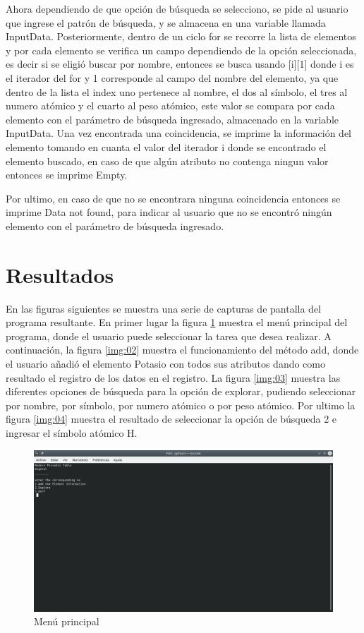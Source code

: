 \documentclass[conference]{IEEEtran}
\begin{document}
Ahora dependiendo de que opción de búsqueda se selecciono, se pide al usuario que ingrese el patrón de búsqueda, y se almacena en una variable llamada InputData. Posteriormente, dentro de un ciclo for se recorre la lista de elementos y por cada elemento se verifica un campo dependiendo de la opción seleccionada, es decir si se eligió buscar por nombre, entonces se busca usando [i][1] donde i es el iterador del for y 1 corresponde al campo del nombre del elemento, ya que dentro de la lista el index uno pertenece al nombre, el dos al símbolo, el tres al numero atómico y el cuarto al peso atómico, este valor se compara por cada elemento con el parámetro de búsqueda ingresado, almacenado en la variable InputData. Una vez encontrada una coincidencia, se imprime la información del elemento tomando en cuanta el valor del iterador i donde se encontrado el elemento buscado, en caso de que algún atributo no contenga ningun valor entonces se imprime Empty.

Por ultimo, en caso de que no se encontrara ninguna coincidencia entonces se imprime Data not found, para indicar al usuario que no se encontró ningún elemento con el parámetro de búsqueda ingresado.

\section{Resultados}
En las figuras siguientes se muestra una serie de capturas de pantalla del programa resultante. En primer lugar la figura \ref{img:01} muestra el menú principal del programa, donde el usuario puede seleccionar la tarea que desea realizar. A continuación, la figura \ref{img:02} muestra el funcionamiento del método add, donde el usuario añadió el elemento Potasio con todos sus atributos dando como resultado el registro de los datos en el registro. La figura \ref{img:03} muestra las diferentes opciones de búsqueda para la opción de explorar, pudiendo seleccionar por nombre, por símbolo, por numero atómico o por peso atómico. Por ultimo la figura \ref{img:04} muestra el resultado de seleccionar la opción de búsqueda 2 e ingresar el símbolo atómico H.\par




\begin{figure}[h!]
\includegraphics[width=1 \columnwidth]{cap_01.png}
\caption{Menú principal}
\label{img:01}
\end{figure}
\end{document}
